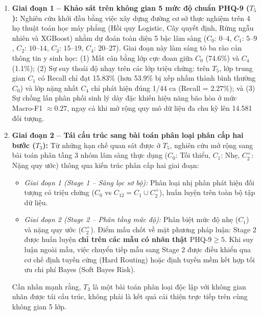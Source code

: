\begin{enumerate}
    \item \textbf{Giai đoạn 1 -- Khảo sát trên không gian 5 mức độ chuẩn PHQ-9 ($T_5$):} 
    Nghiên cứu khởi đầu bằng việc xây dựng đường cơ sở thực nghiệm trên 4 họ thuật toán học máy phẳng (Hồi quy Logistic, Cây quyết định, Rừng ngẫu nhiên và XGBoost) nhằm dự đoán toàn diện 5 bậc lâm sàng ($C_0$: $0$--$4$, $C_1$: $5$--$9$, $C_2$: $10$--$14$, $C_3$: $15$--$19$, $C_4$: $20$--$27$). Giai đoạn này làm sáng tỏ ba rào cản thông tin y sinh học: (1) Mất cân bằng lớp cực đoan giữa $C_0$ (74.6\%) và $C_4$ (1.1\%); (2) Sự suy thoái độ nhạy trên các lớp triệu chứng: trên $T_5$, lớp trung gian $C_1$ có Recall chỉ đạt 15.83\% (hơn 53.9\% bị xếp nhầm thành bình thường $C_0$) và lớp nặng nhất $C_4$ chỉ phát hiện đúng 1/44 ca (Recall = 2.27\%); và (3) Sự chồng lấn phân phối sinh lý dày đặc khiến hiệu năng bão hòa ở mức Macro-F1 $\approx 0.27$, ngay cả khi mở rộng quy mô dữ liệu đa chu kỳ lên 14.581 đối tượng.
    \item \textbf{Giai đoạn 2 -- Tái cấu trúc sang bài toán phân loại phân cấp hai bước ($T_3$):} 
    Từ những hạn chế quan sát được ở $T_5$, nghiên cứu mở rộng sang bài toán phân tầng 3 nhóm lâm sàng thực dụng ($C_0$: Tối thiểu, $C_1$: Nhẹ, $C_2^+$: Nặng quy ước) thông qua kiến trúc phân cấp hai giai đoạn:
    \begin{itemize}
        \item \textit{Giai đoạn 1 (Stage 1 -- Sàng lọc sơ bộ):} Phân loại nhị phân phát hiện đối tượng có triệu chứng ($C_0$ vs $C_{12} = C_1 \cup C_2^+$), huấn luyện trên toàn bộ tập dữ liệu.
        \item \textit{Giai đoạn 2 (Stage 2 -- Phân tầng mức độ):} Phân biệt mức độ nhẹ ($C_1$) và nặng quy ước ($C_2^+$). Điểm mấu chốt về mặt phương pháp luận: Stage 2 được huấn luyện \textbf{chỉ trên các mẫu có nhãn thật $\text{PHQ-9} \ge 5$}. Khi suy luận ngoài mẫu, việc chuyển tiếp mẫu sang Stage 2 được điều khiển qua cơ chế định tuyến cứng (Hard Routing) hoặc định tuyến mềm kết hợp tối ưu chi phí Bayes (Soft Bayes Risk).
    \end{itemize}
    Cần nhấn mạnh rằng, $T_3$ là một bài toán phân loại độc lập với không gian nhãn được tái cấu trúc, không phải là kết quả cải thiện trực tiếp trên cùng không gian 5 lớp.
\end{enumerate}

